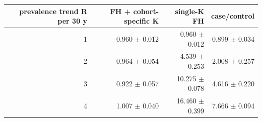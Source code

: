 \begin{tabular}{rrrr}
\toprule
prevalence trend R per 30 y & FH + cohort-specific K & single-K FH & case/control \\
\midrule
1 & 0.960 $\pm$ 0.012 & 0.960 $\pm$ 0.012 & 0.899 $\pm$ 0.034 \\
2 & 0.964 $\pm$ 0.054 & 4.539 $\pm$ 0.253 & 2.008 $\pm$ 0.257 \\
3 & 0.922 $\pm$ 0.057 & 10.275 $\pm$ 0.078 & 4.616 $\pm$ 0.220 \\
4 & 1.007 $\pm$ 0.040 & 16.460 $\pm$ 0.399 & 7.666 $\pm$ 0.094 \\
\bottomrule
\end{tabular}
